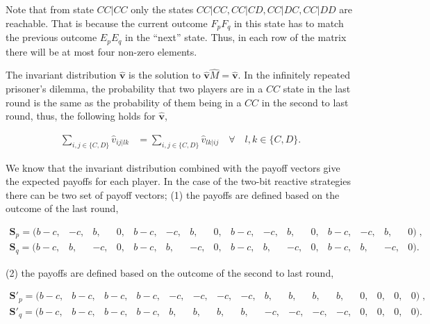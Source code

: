 \documentclass{article}
\theoremstyle{definition}
\begin{document}
Note that from state \(CC|CC\) only the states \(CC|CC, CC|CD, CC|DC, CC|DD\)
are reachable. That is because the current outcome \(F_p F_q\) in this state has
to match the previous outcome \(E_p E_q\) in the ``next'' state. Thus, in each
row of the matrix there will be at most four non-zero elements.

The invariant distribution \(\mathbf{\hat{v}}\) is the solution to
\(\mathbf{\hat{v}} \hat{M} = \mathbf{\hat{v}}\). In the infinitely
repeated prisoner's dilemma, the probability that two players are in a \(CC\)
state in the last round is the same as the probability of them being in a \(CC\)
in the second to last round, thus, the following holds for
\(\mathbf{\hat{v}}\),

\begin{align}\label{eq:last_rounds_equality}
  \sum_{i, j \in \{C, D\}} \hat{v}_{i j | l k} & = \sum_{i, j \in \{C, D\}} \hat{v}_{l k | ij} \quad \forall \quad l, k \in \{C, D\}.
\end{align}

We know that the invariant distribution combined with the payoff vectors give
the expected payoffs for each player. In the case of the two-bit reactive
strategies there can be two set of payoff vectors; (1) the payoffs are
defined based on the outcome of the last round,

\begin{equation}\label{eq:last_round_two_bits}
  \begin{array}{*{16}{c}}
    \mathbf{S}_{p} = ( b - c , & -c , & b , & 0 , & b - c , & -c , & b , & 0 , & b - c , & -c , & b , & 0 , & b - c , & -c , & b , & 0)  \;, \\
    \mathbf{S}_{q} = ( b - c, & b, & -c, & 0, & b - c, & b, & -c, & 0, & b - c, & b, & -c, & 0, & b - c, & b, & -c, & 0).
  \end{array}
\end{equation}

(2) the payoffs are defined based on the outcome of the second to last round,

\begin{equation}\label{eq:second_to_last_round_two_bits}
  \begin{array}{*{16}{c}}
    \mathbf{S}'_{p} = (b - c, & b - c, & b - c, & b - c, & -c, & -c, & -c, & -c, & b, & b, & b, & b, & 0, & 0, & 0, & 0)  \;, \\
    \mathbf{S}'_{q} = (b - c, & b - c, & b - c, & b - c, & b, & b, & b, & b, & -c, & -c, & -c, & -c, & 0, & 0, & 0, & 0).
  \end{array}
\end{equation}
\end{document}
